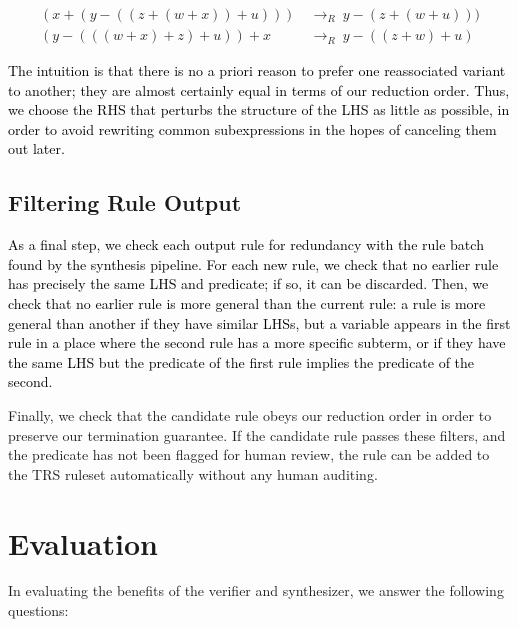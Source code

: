 \documentclass[acmsmall]{acmart}\settopmatter{}
\newcommand{\modified}[1]{\textcolor{black}{{#1}}}
\newcommand{\rewrites}[0]{\:\rightarrow_{R}\:}
\begin{document}
\begin{equation*}
\begin{split}
(x + (y - ((z + (w + x)) + u))) & \rewrites y - (z + (w + u))) \\
(y - (((w + x) + z) + u)) + x & \rewrites y - ((z + w) + u)
\end{split}
\end{equation*}

\modified{The intuition is that there is no a priori reason 
to prefer one reassociated variant to another; they are almost certainly equal in 
terms of our reduction order. Thus, we choose the RHS that perturbs the structure of the 
LHS as little as possible, in order to avoid rewriting common subexpressions in the hopes
of canceling them out later.}


\subsection{Filtering Rule Output}
\label{sec:filtering}
\modified{As a final step, we check each output rule for redundancy with the rule batch found
by the synthesis pipeline. For each new rule, we check
that no earlier rule has precisely the same LHS and predicate; if so, it can be discarded.
Then, we check that no earlier rule is more general than the current rule: a rule is more 
general than another if they have similar LHSs, but a variable appears in the first rule 
in a place where the second rule has a more specific subterm, or if they have the same LHS
but the predicate of the first rule implies the predicate of the second.}

Finally, we
check that the candidate rule obeys our reduction order in order to
preserve our termination guarantee. If the candidate rule passes these
filters, and the predicate has not been flagged for human review, the
rule can be added to the TRS ruleset automatically without any human
auditing.

\section{Evaluation}
\label{sec:evaluation}

\newcommand{\PercentPossibleToSynth}{69\%}
\newcommand{\NumRulesInCorrectnessExperiment}{321}
\newcommand{\PercentRulesResynthesized}{58\%}

In evaluating the benefits of the verifier and synthesizer, we answer the following questions:
\end{document}
